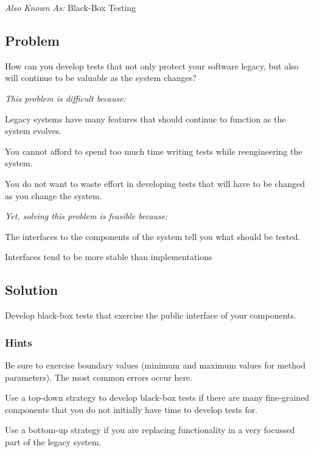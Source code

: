 \documentclass[a4paper,10pt,twoside]{book}
\begin{document}
\emph{Also Known As:}  Black-Box Testing \cite{Pres94a}


\subsection*{Problem}

How can you develop tests that not only protect your software legacy, but also will continue to be valuable as the system changes?

\emph{This problem is difficult because:}

\begin{bulletlist}
\item Legacy systems have many features that should continue to function as the system evolves.
\item You cannot afford to spend too much time writing tests while reengineering the system.
\item You do not want to waste effort in developing tests that will have to be changed as you change the system.
\end{bulletlist}

\emph{Yet, solving this problem is feasible because:}

\begin{bulletlist}
\item The interfaces to the components of the system tell you what should be tested.
\item Interfaces tend to be more stable than implementations
\end{bulletlist}

\subsection*{Solution}

Develop black-box tests that exercise the public interface of your components.

\subsubsection*{Hints}

\begin{bulletlist}
\item Be sure to exercise boundary values (\ie minimum and maximum values for method parameters). The most common errors occur here.
\item Use a top-down strategy to develop black-box tests if there are many fine-grained components that you do not initially have time to develop tests for.
\item Use a bottom-up strategy if you are replacing functionality in a very focussed part of the legacy system.
\end{bulletlist}
\end{document}
